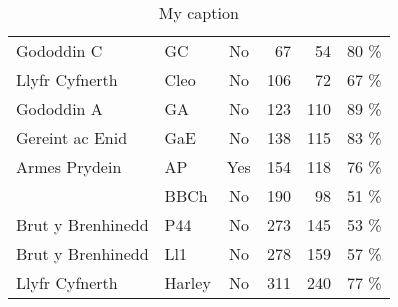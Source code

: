 \begin{table}[]
\begin{tabular}{@{}llcrrr@{}}
Gododdin C                        & GC             & No                                     & 67                                       & 54                                   & 80                                   \% \\
Llyfr Cyfnerth                    & Cleo           & No                                     & 106                                      & 72                                   & 67                                   \% \\
Gododdin A                        & GA             & No                                     & 123                                      & 110                                  & 89                                   \% \\
Gereint ac Enid                   & GaE            & No                                     & 138                                      & 115                                  & 83                                   \% \\
Armes Prydein                     & AP             & Yes                                      & 154                                      & 118                                  & 76                                   \% \\
                                  & BBCh           & No                                     & 190                                      & 98                                   & 51                                   \% \\
Brut y Brenhinedd                 & P44            & No                                     & 273                                      & 145                                  & 53                                   \% \\
Brut y Brenhinedd                 & Ll1            & No                                     & 278                                      & 159                                  & 57                                   \% \\
Llyfr Cyfnerth                    & Harley         & No                                     & 311                                      & 240                                  & 77                                   \% \\ \bottomrule
\end{tabular}
\caption{My caption}
\label{my-label}
\end{table}